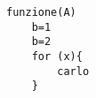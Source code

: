 \documentclass{article}
\begin{document}
\blindtext
	\begin{multicols}{3}
	\setlength{\columnseprule}{1pt}
		\blindtext[2]
	\end{multicols}
\blindtext
\begin{multicols}{2}
		\blindtext[2]
	\end{multicols}
\lstset{tabsize=3}
\begin{lstlisting}
funzione(A)
	b=1
	b=2
	for (x){
		carlo
	}
\end{lstlisting}
\end{document}
